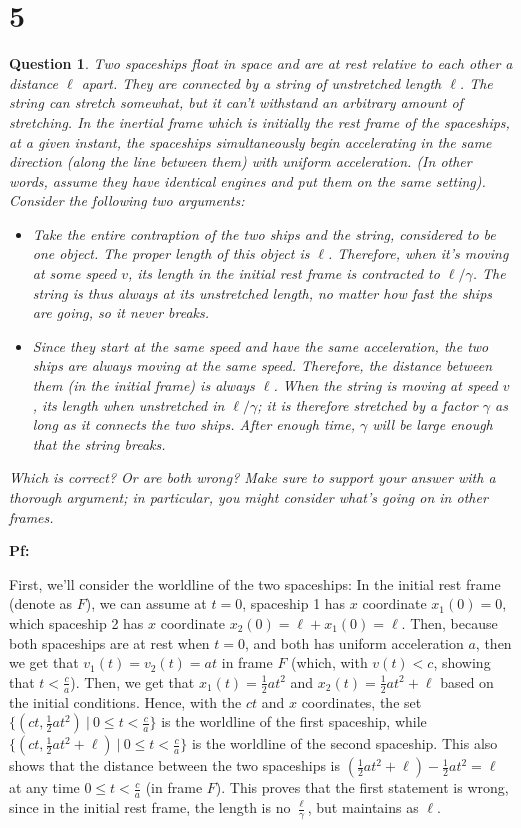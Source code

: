 \documentclass{article}
\newtheorem{question}{Question}
\begin{document}
\section*{5}
\begin{question}\label{q5}
    Two spaceships float in space and are at rest relative to each other a distance $\ell$ apart. They are connected by a string of unstretched length $\ell$. The string can stretch somewhat, but it can't withstand an arbitrary amount of stretching. In the inertial frame which is initially the rest frame of the spaceships, at a given instant, the spaceships simultaneously begin accelerating in the same direction (along the line between them) with uniform acceleration. (In other words, assume they have identical engines and put them on the same setting). Consider the following two arguments:
    \begin{itemize}
        \item Take the entire contraption of the two ships and the string, considered to be one object. The proper length of this object is $\ell$. Therefore, when it's moving at some speed $v$, its length in the initial rest frame is contracted to $\ell/\gamma$. The string is thus always at its unstretched length, no matter how fast the ships are going, so it never breaks.
        \item Since they start at the same speed and have the same acceleration, the two ships are always moving at the same speed. Therefore, the distance between them (in the initial frame) is always $\ell$. When the string is moving at speed $v$, its length when unstretched in $\ell/\gamma$; it is therefore stretched by a factor $\gamma$ as long as it connects the two ships. After enough time, $\gamma$ will be large enough that the string breaks.
    \end{itemize}
    Which is correct? Or are both wrong? Make sure to support your answer with a thorough argument; in particular, you might consider what's going on in \emph{other} frames.
\end{question}

\textbf{Pf:}

First, we'll consider the worldline of the two spaceships: In the initial rest frame (denote as $F$), we can assume at $t=0$, spaceship 1 has $x$ coordinate $x_1(0)=0$, which spaceship 2 has $x$ coordinate $x_2(0)=\ell + x_1(0) = \ell$. Then, because both spaceships are at rest when $t=0$, and both has uniform acceleration $a$, then we get that $v_1(t)=v_2(t) = at$ in frame $F$ (which, with $v(t)<c$, showing that $t < \frac{c}{a}$). Then, we get that $x_1(t) = \frac{1}{2}at^2$ and $x_2(t) = \frac{1}{2}at^2 + \ell$ based on the initial conditions. Hence, with the $ct$ and $x$ coordinates, the set $\{(ct,\frac{1}{2}at^2)\ |\ 0\leq t<\frac{c}{a}\}$ is the worldline of the first spaceship, while $\{(ct,\frac{1}{2}at^2+\ell)\ |\ 0\leq t<\frac{c}{a}\}$ is the worldline of the second spaceship. This also shows that the distance between the two spaceships is $(\frac{1}{2}at^2+\ell)-\frac{1}{2}at^2=\ell$ at any time $0\leq t<\frac{c}{a}$ (in frame $F$). This proves that the first statement is wrong, since in the initial rest frame, the length is no $\frac{\ell}{\gamma}$, but maintains as $\ell$.
\end{document}
